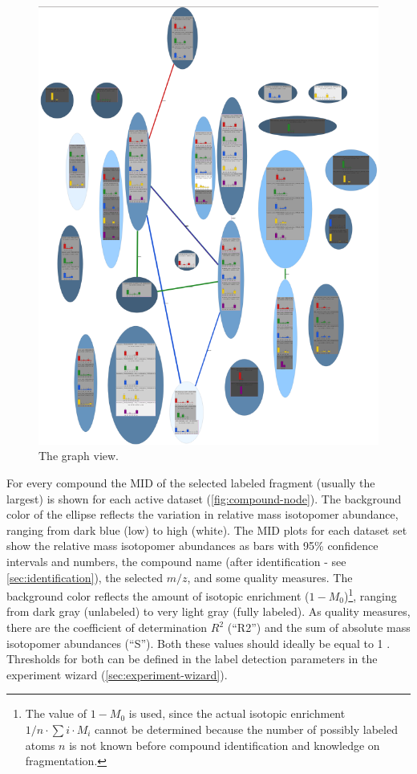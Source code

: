 \documentclass[a4paper,12pt]{scrartcl}
\begin{document}
\begin{figure}[htb]
 \centering
 \includegraphics[width=0.7\linewidth]{./gfx/ss_mainwindow_graphview.png}
 \caption{The graph view.}
 \label{fig:graph-view}
\end{figure}

\label{sec:node}
For every compound the MID of the selected labeled fragment (usually the largest) is shown for each active dataset (\ref{fig:compound-node}). The background color of the ellipse reflects the variation in relative mass isotopomer abundance, ranging from dark blue (low) to high (white). The MID plots for each dataset set show the relative mass isotopomer abundances as bars with 95\% confidence intervals and numbers, the compound name (after identification - see \ref{sec:identification}), the selected $m/z$, and some quality measures. The background color reflects the amount of isotopic enrichment ($1-M_0$)\footnote{The value of $1-M_0$ is used, since the actual isotopic enrichment $1/n \cdot \sum i\cdot M_i$ cannot be determined because the number of possibly labeled atoms $n$ is not known before compound identification and knowledge on fragmentation.}, ranging from dark gray (unlabeled) to very light gray (fully labeled). As quality measures, there are the coefficient of determination $R^2$ (``R2'') and the sum of absolute mass isotopomer abundances (``S''). Both these values should ideally be equal to 1 \citep{Weindl2015a}. Thresholds for both can be defined in the label detection parameters in the experiment wizard (\ref{sec:experiment-wizard}).
\end{document}
